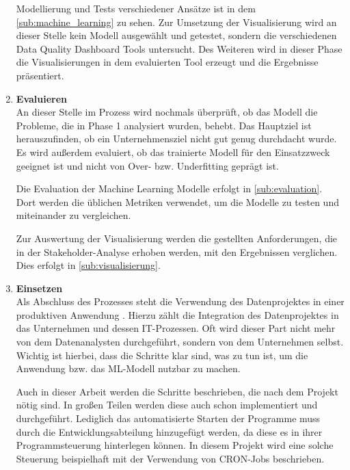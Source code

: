 \begin{enumerate}
 Modellierung und Tests verschiedener Ansätze ist in dem \autoref{sub:machine_learning} zu sehen. 
 Zur Umsetzung der Visualisierung wird an dieser Stelle kein Modell ausgewählt und getestet, sondern die verschiedenen Data Quality Dashboard Tools untersucht. 
 Des Weiteren wird in dieser Phase die Visualisierungen in dem evaluierten Tool erzeugt und die Ergebnisse präsentiert. 
 
 \item \textbf{Evaluieren} \\
 An dieser Stelle im Prozess wird nochmals überprüft, ob das Modell die Probleme, die in Phase 1 analysiert wurden, behebt.
 Das Hauptziel ist herauszufinden, ob ein Unternehmensziel nicht gut genug durchdacht wurde. \cite{wirth2000}
 Es wird außerdem evaluiert, ob das trainierte Modell für den Einsatzzweck geeignet ist und nicht von Over- bzw. Underfitting geprägt ist. \cite{d.kelleher2015crispdm}
 
 Die Evaluation der Machine Learning Modelle erfolgt in \autoref{sub:evaluation}. 
 Dort werden die üblichen Metriken verwendet, um die Modelle zu testen und miteinander zu vergleichen. 
 
 Zur Auswertung der Visualisierung werden die gestellten Anforderungen, die in der Stakeholder-Analyse erhoben werden, mit den Ergebnissen verglichen. 
 Dies erfolgt in \autoref{sub:visualisierung}.
 
 \item \textbf{Einsetzen} \\
 Als Abschluss des Prozesses steht die Verwendung des Datenprojektes in einer produktiven Anwendung \cite{d.kelleher2015crispdm}.
 Hierzu zählt die Integration des Datenprojektes in das Unternehmen und dessen IT-Prozessen. 
 Oft wird dieser Part nicht mehr von dem Datenanalysten durchgeführt, sondern von dem Unternehmen selbst.
 Wichtig ist hierbei, dass die Schritte klar sind, was zu tun ist, um die Anwendung bzw. das ML-Modell nutzbar zu machen. \cite{wirth2000}
 
 
 Auch in dieser Arbeit werden die Schritte beschrieben, die nach dem Projekt nötig sind. 
 In großen Teilen werden diese auch schon implementiert und durchgeführt. 
 Lediglich das automatisierte Starten der Programme muss durch die Entwicklungsabteilung hinzugefügt werden, da diese es in ihrer Programmsteuerung hinterlegen können. 
 In diesem Projekt wird eine solche Steuerung beispielhaft mit der Verwendung von CRON-Jobs beschrieben. 
\end{enumerate}





